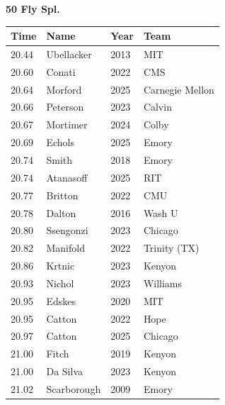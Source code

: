 \noindent\begin{minipage}[t]{0.98\textwidth}
\centering
\textbf{\textcolor{teamprimary}{50 Fly Spl.}}\par
\vspace{0.5em}
\centering
\small
\renewcommand{\arraystretch}{1.0}
\setlength{\tabcolsep}{4pt}
\begin{tabular}{@{}p{2.5cm}p{4.5cm}p{1.5cm}p{2.5cm}@{}}
\toprule
\textbf{Time} & \textbf{Name} & \textbf{Year} & \textbf{Team} \\
\midrule
20.44 & Ubellacker & 2013 & MIT \\
20.60 & Conati & 2022 & CMS \\
20.64 & Morford & 2025 & Carnegie Mellon \\
20.66 & Peterson & 2023 & Calvin \\
20.67 & Mortimer & 2024 & Colby \\
20.69 & Echols & 2025 & Emory \\
20.74 & Smith & 2018 & Emory \\
20.74 & Atanasoff & 2025 & RIT \\
20.77 & Britton & 2022 & CMU \\
20.78 & Dalton & 2016 & Wash U \\
20.80 & Ssengonzi & 2023 & Chicago \\
20.82 & Manifold & 2022 & Trinity (TX) \\
20.86 & Krtnic & 2023 & Kenyon \\
20.93 & Nichol & 2023 & Williams \\
20.95 & Edskes & 2020 & MIT \\
20.95 & Catton & 2022 & Hope \\
20.97 & Catton & 2025 & Chicago \\
21.00 & Fitch & 2019 & Kenyon \\
21.00 & Da Silva & 2023 & Kenyon \\
21.02 & Scarborough & 2009 & Emory \\
\bottomrule
\end{tabular}
\end{minipage}
\vspace{1.2em}
